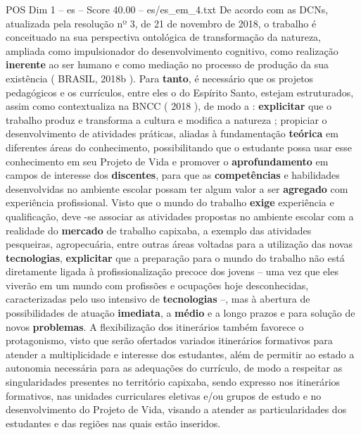 \begin{textsample}{POS Dim 1 – es – Score 40.00 – es/es\_em\_4.txt}
De acordo com as DCNs, atualizada pela resolução nº 3, de 21 de novembro de 2018, o trabalho é conceituado na sua perspectiva ontológica de transformação da natureza, ampliada como impulsionador do desenvolvimento cognitivo, como realização \textbf{inerente} ao ser humano e como mediação no processo de produção da sua existência ( BRASIL, 2018b ).
Para \textbf{tanto}, é necessário que os projetos pedagógicos e os currículos, entre eles o do Espírito Santo, estejam estruturados, assim como contextualiza na BNCC ( 2018 ), de modo a : \textbf{explicitar} que o trabalho produz e transforma a cultura e modifica a natureza ; propiciar o desenvolvimento de atividades práticas, aliadas à fundamentação \textbf{teórica} em diferentes áreas do conhecimento, possibilitando que o estudante possa usar esse conhecimento em seu Projeto de Vida e promover o \textbf{aprofundamento} em campos de interesse dos \textbf{discentes}, para que as \textbf{competências} e habilidades desenvolvidas no ambiente escolar possam ter algum valor a ser \textbf{agregado} com experiência profissional.
Visto que o mundo do trabalho \textbf{exige} experiência e qualificação, deve -se associar as atividades propostas no ambiente escolar com a realidade do \textbf{mercado} de trabalho capixaba, a exemplo das atividades pesqueiras, agropecuária, entre outras áreas voltadas para a utilização das novas \textbf{tecnologias}, \textbf{explicitar} que a preparação para o mundo do trabalho não está diretamente ligada à profissionalização precoce dos jovens – uma vez que eles viverão em um mundo com profissões e ocupações hoje desconhecidas, caracterizadas pelo uso intensivo de \textbf{tecnologias} –, mas à abertura de possibilidades de atuação \textbf{imediata}, a \textbf{médio} e a longo prazos e para solução de novos \textbf{problemas}.
A flexibilização dos itinerários também favorece o protagonismo, visto que serão ofertados variados itinerários formativos para atender a multiplicidade e interesse dos estudantes, além de permitir ao estado a autonomia necessária para as adequações do currículo, de modo a respeitar as singularidades presentes no território capixaba, sendo expresso nos itinerários formativos, nas unidades curriculares eletivas e/ou grupos de estudo e no desenvolvimento do Projeto de Vida, visando a atender as particularidades dos estudantes e das regiões nas quais estão inseridos.

\end{textsample}
